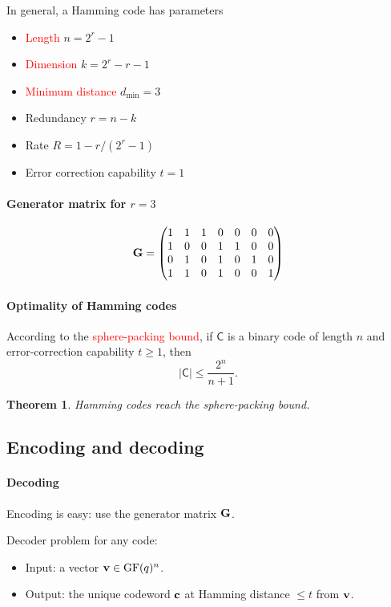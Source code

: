 \documentclass[a4paper, 11pt, openany]{book}
\numberwithin{equation}{section}
\theoremstyle{plain}
\newtheorem{theorem}	[equation]	{Theorem}
\theoremstyle{definition}
\newcommand{\GF}{\mathrm{GF}}
\newcommand{\dmin}{d_{\min}}
\newcommand{\Important}[1]{\textcolor{red}{#1}}
\newcommand{\code}[1]{\mathsf{#1}}
\begin{document}
In general, a Hamming code has parameters
\begin{itemize}
	\item \Important{Length} $n= 2^r - 1$
	\item \Important{Dimension} $k = 2^r-r-1$
	\item \Important{Minimum distance} $\dmin = 3$
	\item Redundancy $r = n-k$
	\item Rate $R = 1 - r/(2^r-1)$
	\item Error correction capability $t=1$
\end{itemize}

\paragraph{Generator matrix for $r=3$}
\[
	{\bf G} = \begin{pmatrix}
	1 & 1 & 1 & 0 & 0 & 0 & 0\\
	1 & 0 & 0 & 1 & 1 & 0 & 0\\
	0 & 1 & 0 & 1 & 0 & 1 & 0\\
	1 & 1 & 0 & 1 & 0 & 0 & 1\\
	\end{pmatrix}	
\]



\paragraph{Optimality of Hamming codes}
According to the \Important{sphere-packing bound}, if $\code{C}$ is a binary code of length $n$ and error-correction capability $t \ge 1$, then
\[
	|\code{C}| \le \frac{2^n}{n+1}.
\]

\begin{theorem}
Hamming codes reach the sphere-packing bound.
\end{theorem}



\subsection{Encoding and decoding}


\paragraph{Decoding}
Encoding is easy: use the generator matrix ${\bf G}$.

Decoder problem for any code:
\begin{itemize}
	\item Input: a vector ${\bf v} \in \GF(q)^n$. 

	\item Output: the unique codeword ${\bf c}$ at Hamming distance $\le t$ from ${\bf v}$.
\end{itemize}
\end{document}
